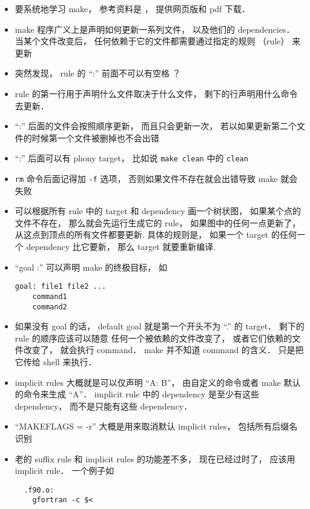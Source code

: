 

\begin{itemize}
\item 要系统地学习 make， 参考资料是 ， 提供网页版和 pdf 下载．
\item make 程序广义上是声明如何更新一系列文件， 以及他们的 dependencies． 当某个文件改变后， 任何依赖于它的文件都需要通过指定的规则 （rule） 来更新
\item 突然发现， rule 的 “:” 前面不可以有空格 ？
\item rule 的第一行用于声明什么文件取决于什么文件， 剩下的行声明用什么命令去更新．
\item “:” 后面的文件会按照顺序更新， 而且只会更新一次， 若以如果更新第二个文件的时候第一个文件被删掉也不会出错
\item “:” 后面可以有 phony target， 比如说 \lstinline|make clean| 中的 \lstinline|clean|
\item \lstinline|rm| 命令后面记得加 \lstinline|-f| 选项， 否则如果文件不存在就会出错导致 make 就会失败
\item 可以根据所有 rule 中的 target 和 dependency 画一个树状图， 如果某个点的文件不存在， 那么就会先运行生成它的 rule， 如果图中的任何一点更新了， 从这点到顶点的所有文件都要更新. 具体的规则是， 如果一个 target 的任何一个 dependency 比它要新， 那么 target 就要重新编译.
\item “goal :” 可以声明 make 的终极目标， 如
\begin{lstlisting}
goal: file1 file2 ...
	command1
	command2
\end{lstlisting}
\item 如果没有 goal 的话， default goal 就是第一个开头不为 “.” 的 target． 剩下的 rule 的顺序应该可以随意
任何一个被依赖的文件改变了， 或者它们依赖的文件改变了， 就会执行 command． make 并不知道 command 的含义． 只是把它传给 shell 来执行．
\item implicit rules 大概就是可以仅声明 “A: B”， 由自定义的命令或者 make 默认的命令来生成 “A”． implicit rule 中的 dependency 是至少有这些 dependency， 而不是只能有这些 dependency．
\item “MAKEFLAGS = -r” 大概是用来取消默认 implicit rules， 包括所有后缀名识别
\item 老的 suffix rule 和 implicit rules 的功能差不多， 现在已经过时了， 应该用 implicit rule． 一个例子如
\begin{lstlisting}
  .f90.o:
	gfortran -c $<

\end{lstlisting}
\end{itemize}
